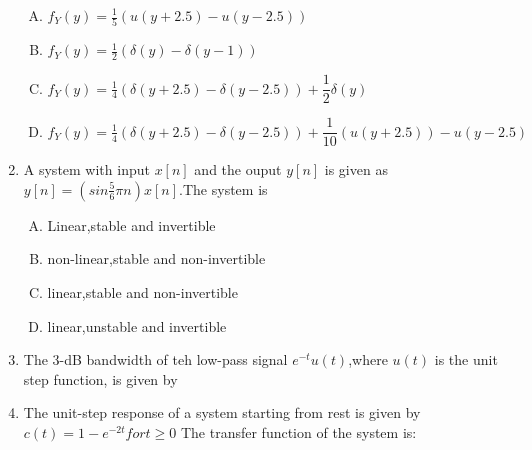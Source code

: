\documentclass[journal,12pt,twocolumn]{IEEEtran}
\begin{document}
\begin{enumerate}
\begin{enumerate}[(A)]

\setlength\itemsep{2em}

\item $f_Y(y)=\frac{1}{5}(u(y+2.5)-u(y-2.5))$
\item $f_Y(y)=\frac{1}{2}(\delta(y)-\delta(y-1))$
\item $f_Y(y)=\frac{1}{4}(\delta(y+2.5)-\delta(y-2.5))+\dfrac{1}{2}\delta(y)$
\item $f_Y(y)=\frac{1}{4}(\delta(y+2.5)-\delta(y-2.5))+\dfrac{1}{10}(u(y+2.5))-u(y-2.5)$


\end{enumerate}

\item A system with input $x[n]$ and the ouput $y[n]$ is given as $y[n]=(sin\frac{5}{6}\pi n)x[n]$.The system is
\begin{enumerate}[(A)]

\setlength\itemsep{4em}


\item Linear,stable and invertible
\item non-linear,stable and non-invertible
\item linear,stable and non-invertible
\item linear,unstable and invertible


\end{enumerate}








\item The 3-dB bandwidth of teh low-pass signal $e^{-t}u(t)$,where $u(t)$ is the unit step function, is given by

\begin{enumerate}[(A)]
\end{enumerate}


\item The unit-step response of a system starting from rest is given by \newline $c(t)=1-e^{-2t} for t \geq 0$
\newline The transfer function of the system is:



\end{enumerate}
\end{document}

